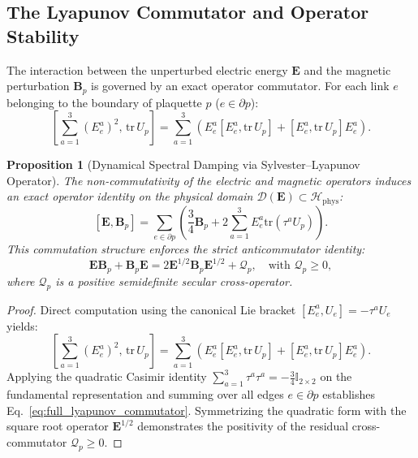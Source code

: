 \documentclass[11pt,reqno]{article}
\newtheorem{proposition}[theorem]{Proposition}
\begin{document}
\subsection{The Lyapunov Commutator and Operator Stability}
The interaction between the unperturbed electric energy $\mathbf{E}$ and the magnetic perturbation $\mathbf{B}_p$ is governed by an exact operator commutator. For each link $e$ belonging to the boundary of plaquette $p$ ($e \in \partial p$):
\begin{equation}
    \label{eq:link_commutator_first_step}
    \left[ \sum_{a=1}^3 (E_e^a)^2, \, \mathrm{tr}\,U_p \right] = \sum_{a=1}^3 \left( E_e^a [E_e^a, \mathrm{tr}\,U_p] + [E_e^a, \mathrm{tr}\,U_p] E_e^a \right).
\end{equation}
\begin{proposition}[Dynamical Spectral Damping via Sylvester--Lyapunov Operator]
\label{prop:lyapunov_damping}
The non-commutativity of the electric and magnetic operators induces an exact operator identity on the physical domain $\mathcal{D}(\mathbf{E}) \subset \mathcal{H}_{\mathrm{phys}}$:
\begin{equation}
    \label{eq:full_lyapunov_commutator}
    [\mathbf{E}, \mathbf{B}_p] = \sum_{e \in \partial p} \left( \frac{3}{4}\mathbf{B}_p + 2 \sum_{a=1}^3 E_e^a \mathrm{tr}(\tau^a U_p) \right).
\end{equation}
This commutation structure enforces the strict anticommutator identity:
\begin{equation}
    \label{eq:sylvester_lyapunov_matrix}
    \mathbf{E} \mathbf{B}_p + \mathbf{B}_p \mathbf{E} = 2 \mathbf{E}^{1/2} \mathbf{B}_p \mathbf{E}^{1/2} + \mathcal{Q}_p, \quad \text{with } \mathcal{Q}_p \ge 0,
\end{equation}
where $\mathcal{Q}_p$ is a positive semidefinite secular cross-operator.
\end{proposition}

\begin{proof}
Direct computation using the canonical Lie bracket $[E_e^a, U_e] = -\tau^a U_e$ yields:
\begin{equation}
    \left[ \sum_{a=1}^3 (E_e^a)^2, \, \mathrm{tr}\,U_p \right] = \sum_{a=1}^3 \left( E_e^a [E_e^a, \mathrm{tr}\,U_p] + [E_e^a, \mathrm{tr}\,U_p] E_e^a \right).
\end{equation}
Applying the quadratic Casimir identity $\sum_{a=1}^3 \tau^a \tau^a = -\frac{3}{4} \mathbb{I}_{2 \times 2}$ on the fundamental representation and summing over all edges $e \in \partial p$ establishes Eq.~\eqref{eq:full_lyapunov_commutator}. Symmetrizing the quadratic form with the square root operator $\mathbf{E}^{1/2}$ demonstrates the positivity of the residual cross-commutator $\mathcal{Q}_p \ge 0$.
\end{proof}
\end{document}
